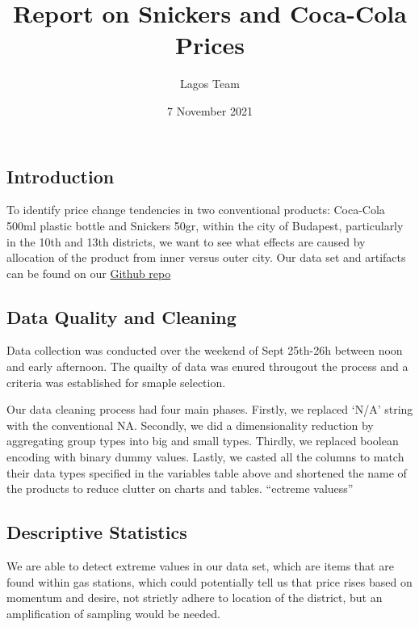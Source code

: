 \documentclass[
  9pt,
]{article}
\title{Report on Snickers and Coca-Cola Prices}
\author{Lagos Team}
\date{7 November 2021}
\begin{document}
\maketitle

\hypertarget{introduction}{%
\subsection{Introduction}\label{introduction}}

To identify price change tendencies in two conventional products:
Coca-Cola 500ml plastic bottle and Snickers 50gr, within the city of
Budapest, particularly in the 10th and 13th districts, we want to see
what effects are caused by allocation of the product from inner versus
outer city. Our data set and artifacts can be found on our
\href{https://github.com/nszoni/lagos-team/coding-1/}{Github repo}

\hypertarget{data-quality-and-cleaning}{%
\subsection{Data Quality and Cleaning}\label{data-quality-and-cleaning}}

Data collection was conducted over the weekend of Sept 25th-26h between
noon and early afternoon. The quailty of data was enured througout the
process and a criteria was established for smaple selection.

Our data cleaning process had four main phases. Firstly, we replaced
`N/A' string with the conventional NA. Secondly, we did a dimensionality
reduction by aggregating group types into big and small types. Thirdly,
we replaced boolean encoding with binary dummy values. Lastly, we casted
all the columns to match their data types specified in the variables
table above and shortened the name of the products to reduce clutter on
charts and tables. ``ectreme valuess''

\hypertarget{descriptive-statistics}{%
\subsection{Descriptive Statistics}\label{descriptive-statistics}}

We are able to detect extreme values in our data set, which are items
that are found within gas stations, which could potentially tell us that
price rises based on momentum and desire, not strictly adhere to
location of the district, but an amplification of sampling would be
needed.
\end{document}
